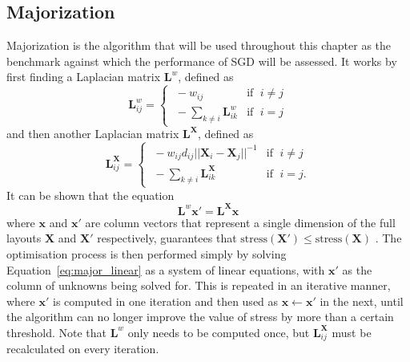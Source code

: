\subsection{Majorization}
\label{sec:majorization}
Majorization is the algorithm that will be used throughout this chapter as the benchmark against which the performance of SGD will be assessed.
It works by first finding a Laplacian matrix $\mathbf{L}^w$, defined as
\begin{equation}
  \mathbf{L}_{ij}^w =
  \begin{cases}
    \;-w_{ij} & \text{if }\;i\neq j\\
    \;-\sum_{k\neq i}\mathbf{L}_{ik}^w & \text{if }\;i=j
  \end{cases}
\end{equation}
and then another Laplacian matrix $\mathbf{L^X}$, defined as
\begin{equation}
  \mathbf{L}_{ij}^\mathbf{X} =
  \begin{cases}
    \;-w_{ij}d_{ij}||\mathbf{X}_i-\mathbf{X}_j||^{-1} & \text{if }\;i\neq j\\
    \;-\sum_{k\neq i}\mathbf{L}_{ik}^\mathbf{X} & \text{if }\;i=j.
  \end{cases}
\end{equation}
It can be shown that the equation
\begin{equation}
  \mathbf{L}^w\mathbf{x}' = \mathbf{L^Xx}
  \label{eq:major_linear}
\end{equation}
where $\mathbf{x}$ and $\mathbf{x}'$ are column vectors that represent a single dimension of the full layouts $\mathbf{X}$ and $\mathbf{X}'$ respectively, guarantees that $\text{stress}(\mathbf{X}') \leq \text{stress}(\mathbf{X})$ \cite{Gansner2004}.
The optimisation process is then performed simply by solving Equation~\eqref{eq:major_linear} as a system of linear equations, with $\mathbf{x}'$ as the column of unknowns being solved for. This is repeated in an iterative manner, where $\mathbf{x}'$ is computed in one iteration and then used as $\mathbf{x}\leftarrow\mathbf{x}'$ in the next, until the algorithm can no longer improve the value of stress by more than a certain threshold. Note that $\mathbf{L}^w$ only needs to be computed once, but $\mathbf{L}_{ij}^\mathbf{X}$ must be recalculated on every iteration.

